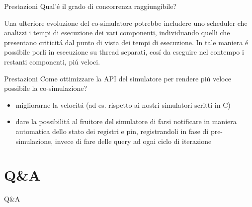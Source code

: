\documentclass{beamer}
\begin{document}
\begin{frame}{Prestazioni}
Qual’\'e il grado di concorrenza raggiungibile?

\bigskip

Una ulteriore evoluzione del co-simulatore potrebbe includere uno scheduler che analizzi i tempi di esecuzione dei vari componenti,
individuando quelli che presentano criticit\'a dal punto di vista dei tempi di esecuzione. In tale maniera \'e possibile porli in esecuzione su
thread separati, cos\'i da eseguire nel contempo i restanti componenti, pi\'u veloci.
\end{frame}

\begin{frame}{Prestazioni}
Come ottimizzare la API del simulatore per rendere pi\'u veloce possibile la co-simulazione?
\begin{itemize}
  \item migliorarne la velocit\'a (ad es. rispetto ai nostri simulatori scritti in C)
  \item dare la possibilit\'a al fruitore del simulatore di farsi notificare in maniera automatica dello stato dei registri e pin, registrandoli in fase
di pre-simulazione, invece di fare delle query ad ogni ciclo di iterazione
\end{itemize}
\end{frame}

\section{Q\&A}
\begin{frame}{Q\&A}
\end{frame}
\end{document}
